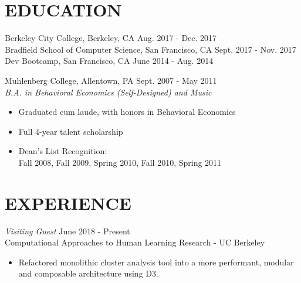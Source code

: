 \documentclass[margin, 10pt]{res} %
\begin{document}
\begin{resume}


\section{\small\bf EDUCATION}
Berkeley City College, Berkeley, CA \hfill Aug. 2017 - Dec. 2017 \\
Bradfield School of Computer Science, San Francisco, CA \hfill Sept. 2017 - Nov. 2017 \\
Dev Bootcamp, San Francisco, CA \hfill June 2014 - Aug. 2014

Muhlenberg College, Allentown, PA \hfill Sept. 2007 - May 2011 \\
{\sl B.A. in Behavioral Economics (Self-Designed) and Music}
\begin{itemize} \itemsep -2pt %
\item Graduated cum laude, with honors in Behavioral Economics
\item Full 4-year talent scholarship
\item Dean’s List Recognition: \\
Fall 2008, Fall 2009, Spring 2010, Fall 2010, Spring 2011
\end{itemize}



\section{\small\bf EXPERIENCE}

{\sl Visiting Guest} \hfill June 2018 - Present \\
Computational Approaches to Human Learning Research - UC Berkeley
\begin{itemize} \itemsep -2pt %
\item Refactored monolithic cluster analysis tool into a more performant, modular and composable architecture using D3.
\end{itemize}


\end{resume}
\end{document}
